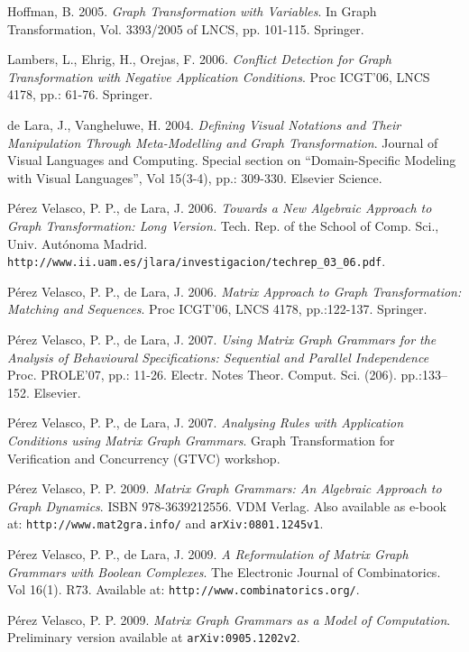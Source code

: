 \documentclass{fundam}
\begin{document}
\begin{thebibliography}{10}
 Hoffman, B. 2005.  \emph{Graph Transformation with
    Variables}.  In Graph Transformation, Vol. 3393/2005 of LNCS, pp.
  101-115. Springer.

 Lambers, L., Ehrig, H., Orejas, F. 2006.  {\em
    Conflict Detection for Graph Transformation with Negative
    Application Conditions}.  Proc ICGT'06, LNCS 4178, pp.: 61-76.
  Springer.

 de Lara, J., Vangheluwe, H. 2004.  {\em Defining Visual
    Notations and Their Manipulation Through Meta-Modelling and Graph
    Transformation}.  Journal of Visual Languages and Computing.
  Special section on ``Domain-Specific Modeling with Visual
  Languages'', Vol 15(3-4), pp.: 309-330. Elsevier Science.

 P\'erez Velasco, P. P., de Lara, J. 2006.
  \emph{Towards a New Algebraic Approach to Graph Transformation: Long
    Version.}  Tech. Rep. of the School of Comp. Sci., Univ.
  Aut\'onoma Madrid.
  {\texttt{http://www.ii.uam.es/jlara/investigacion/techrep\_03\_06.pdf}}.

 P\'erez Velasco, P. P., de Lara, J. 2006.  {\em
    Matrix Approach to Graph Transformation: Matching and Sequences}.
  Proc ICGT'06, LNCS 4178, pp.:122-137. Springer.

 P\'erez Velasco, P. P., de Lara, J. 2007.  {\em
    Using Matrix Graph Grammars for the Analysis of Behavioural
    Specifications: Sequential and Parallel Independence} Proc.
  PROLE'07, pp.: 11-26. Electr. Notes
  Theor. Comput. Sci. (206). pp.:133--152. Elsevier.

 P\'erez Velasco, P. P., de Lara, J. 2007.  {\em
    Analysing Rules with Application Conditions using Matrix Graph
    Grammars}.  Graph Transformation for Verification and Concurrency
  (GTVC) workshop.

 P\'erez Velasco, P. P. 2009.  \emph{Matrix Graph
    Grammars: An Algebraic Approach to Graph Dynamics}.  ISBN
  978-3639212556. VDM Verlag. Also available as e-book at:
  {\texttt{http://www.mat2gra.info/}} and \texttt{arXiv:0801.1245v1}.

 P\'erez Velasco, P. P., de Lara, J. 2009.
  \emph{A Reformulation of Matrix Graph Grammars with Boolean
    Complexes}. The Electronic Journal of Combinatorics. Vol
  16(1). R73. Available at: {\texttt{http://www.combinatorics.org/}}.

 P\'erez Velasco, P. P. 2009. \emph{Matrix Graph
    Grammars as a Model of Computation}. Preliminary version available
  at {\texttt{arXiv:0905.1202v2}}.


\end{thebibliography}
\end{document}
